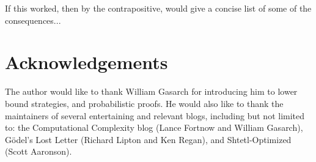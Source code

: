 \documentclass[12pt]{article}
\theoremstyle{definition}
\begin{document}
If this worked, then by the contrapositive,
\cite{fenner1996complexity} would give a concise list of some of the consequences...

\section{Acknowledgements}

The author would like to thank William Gasarch for introducing him
to lower bound strategies, and probabilistic proofs.
He would also like to thank the maintainers of
several entertaining and relevant blogs, including but
not limited to: the Computational Complexity blog
(Lance Fortnow and William Gasarch), 
G\"odel's Lost Letter (Richard Lipton and Ken Regan),
and Shtetl-Optimized (Scott Aaronson). 



\end{document}

